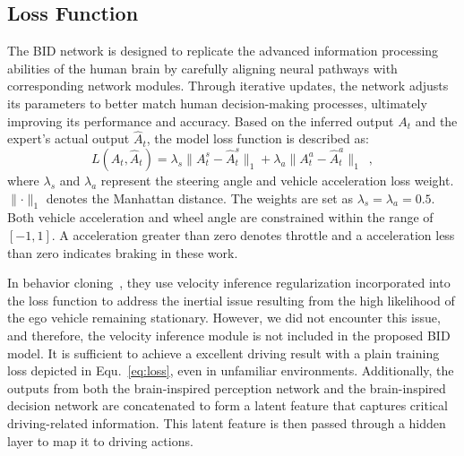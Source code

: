 \subsection{Loss Function}

\hspace{1pc}The BID network is designed to replicate the advanced information processing abilities of the human brain by carefully aligning neural pathways with corresponding network modules. 
Through iterative updates, the network adjusts its parameters to better match human decision-making processes, ultimately improving its performance and accuracy.
%
Based on the inferred output $A_t$ and the expert's actual output $\hat{A}_t$, the model loss function is described as:
\begin{equation}\label{eq:loss}
	L(A_t, \hat{A}_t) 
	= \lambda_{s} \lVert A_{t}^s-\hat{A}_t^s \rVert_{1}
	+ \lambda_{a}\lVert A_{t}^a-\hat{A}_{t}^a\rVert_{1} \enspace ,
\end{equation}
where $\lambda_{s}$ and $\lambda_a$ represent the steering angle and vehicle acceleration loss weight.
$\lVert\cdot\rVert_{1}$ denotes the Manhattan distance.
The weights are set as $\lambda_{s} = \lambda_{a} = 0.5$. 
Both vehicle acceleration and wheel angle are constrained within the range of $[-1, 1]$.
A acceleration greater than zero denotes throttle and a acceleration less than zero indicates braking in these work.


In behavior cloning~\cite{Codevilla:2019}, they use velocity inference regularization incorporated into the loss function to address the inertial issue resulting from the high likelihood of the ego vehicle remaining stationary.
However, we did not encounter this issue, and therefore, the velocity inference module is not included in the proposed BID model.
It is sufficient to achieve a excellent driving result with a plain training loss depicted in Equ.~\ref{eq:loss}, even in unfamiliar environments.
%
Additionally, the outputs from both the brain-inspired perception network and the brain-inspired decision network are concatenated to form a latent feature that captures critical driving-related information. 
This latent feature is then passed through a hidden layer to map it to driving actions.


%

